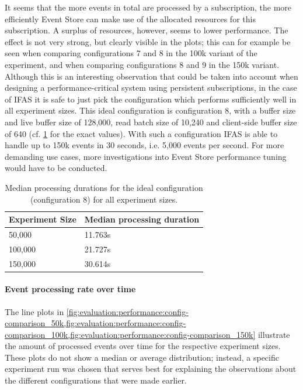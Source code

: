 It seems that the more events in total are processed by a subscription, the more efficiently Event Store can make use of the allocated resources for this subscription.
A surplus of resources, however, seems to lower performance.
The effect is not very strong, but clearly visible in the plots; this can for example be seen when comparing configurations 7 and 8 in the 100k variant of the experiment, and when comparing configurations 8 and 9 in the 150k variant.
Although this is an interesting observation that could be taken into account when designing a performance-critical system using persistent subscriptions, in the case of \ac{IFAS} it is safe to just pick the configuration which performs sufficiently well in all experiment sizes.
This ideal configuration is configuration 8, with a buffer size and live buffer size of 128,000, read batch size of 10,240 and client-side buffer size of 640 (cf. \cref{table:median-durations-config-8} for the exact values).
With such a configuration \ac{IFAS} is able to handle up to 150k events in 30 seconds, i.e. 5,000 events per second.
For more demanding use cases, more investigations into Event Store performance tuning would have to be conducted.

\begin{table}
\centering
\caption[Median processing durations for the ideal configuration for all experiment sizes.]
{Median processing durations for the ideal configuration (configuration 8) for all experiment sizes.}
\begin{tabular}{l|l}
\textbf{Experiment Size} & \textbf{Median processing duration} \\ \hline
50,000 & 11.763s \\
100,000 & 21.727s \\
150,000 & 30.614s
\end{tabular}
\label{table:median-durations-config-8}
\end{table}

\FloatBarrier

\paragraph{Event processing rate over time}

The line plots in \cref{fig:evaluation:performance:config-comparison_50k,fig:evaluation:performance:config-comparison_100k,fig:evaluation:performance:config-comparison_150k} illustrate the amount of processed events over time for the respective experiment sizes.
These plots do not show a median or average distribution; instead, a specific experiment run was chosen that serves best for explaining the observations about the different configurations that were made earlier.

